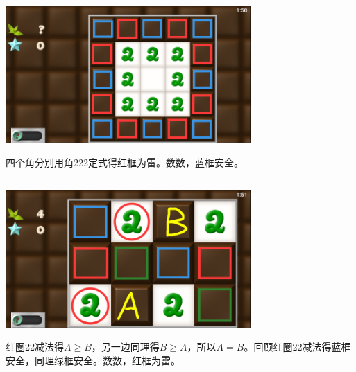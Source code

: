 \subsection{} %
\begin{center}
    \includegraphics[width=0.7\textwidth]{puzzle/47-1.png}
\end{center}
四个角分别用角222定式得红框为雷。数数，蓝框安全。

\subsection{} %
\begin{center}
    \includegraphics[width=0.7\textwidth]{puzzle/48-1.png}
\end{center}
红圈22减法得$A\ge B$，另一边同理得$B\ge A$，所以$A=B$。回顾红圈22减法得蓝框安全，同理绿框安全。数数，红框为雷。


